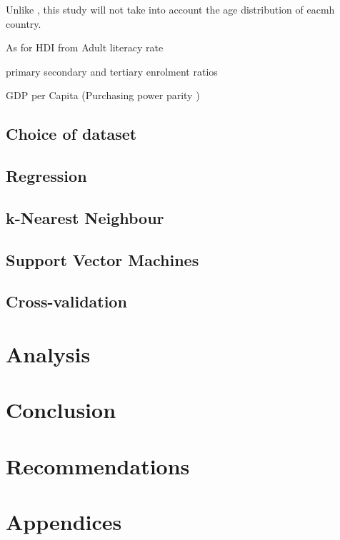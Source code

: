 \documentclass[10pt,a4paper]{article}
\begin{document}
Unlike \cite{Shaw2005}, this study will not take into account the age distribution of eacmh country.

As for HDI from \cite{Bulled2010}
Adult literacy rate

primary secondary and tertiary enrolment ratios

GDP per Capita (Purchasing power parity )

\subsection{Choice of dataset}

\subsection{Regression}

\subsection{k-Nearest Neighbour}

\subsection{Support Vector Machines}

\subsection{Cross-validation}

\section{Analysis}

\section{Conclusion}

\section{Recommendations}



\section{Appendices}
\end{document}
